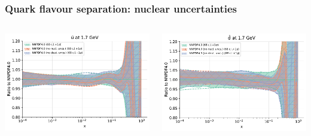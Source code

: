 \documentclass{beamer}
\begin{document}
\begin{frame}
 \frametitle{Quark flavour separation: nuclear uncertainties}
 \footnotesize
 \centering
 \begin{columns}[c]
  \begin{column}{0.5\textwidth}
   \centering
   \includegraphics[width=\columnwidth]{plots/nuclear_baru}\\
  \end{column}
  \begin{column}{0.5\textwidth}
   \centering
   \includegraphics[width=\columnwidth]{plots/nuclear_bard}\\
  \end{column}
 \end{columns}
  \begin{columns}[c]

\end{columns}
\end{frame}
\end{document}
